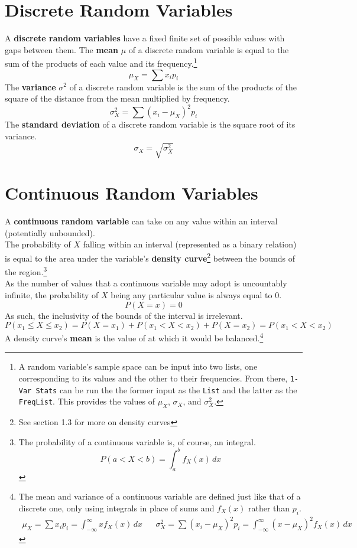 \documentclass[../AP_Statistics.tex]{subfiles}
\begin{document}
		\section{Discrete Random Variables}
			A \textbf{discrete random variables} have a fixed finite set of possible values with gaps between them.
			The \textbf{mean} $\mu$ of a discrete random variable is equal to the sum of the products of each value and its frequency.\footnote{A random variable's sample space can be input into two lists, one corresponding to its values and the other to their frequencies. From there, \texttt{1-Var Stats} can be run the the former input as the \texttt{List} and the latter as the \texttt{FreqList}. This provides the values of $\mu_X$, $\sigma_X$, and $\sigma_X^2$.}
			\[\mu_X = \sum x_ip_i\]
			The \textbf{variance} $\sigma^2$ of a discrete random variable is the sum of the products of the square of the distance from the mean multiplied by frequency.
			\[\sigma_X^2 = \sum(x_i - \mu_X)^2p_i\]
			The \textbf{standard deviation} of a discrete random variable is the square root of its variance.
			\[\sigma_X = \sqrt{\sigma_X^2}\]
		\section{Continuous Random Variables}
			A \textbf{continuous random variable} can take on any value within an interval (potentially unbounded). \\
			The probability of $X$ falling within an interval (represented as a binary relation) is equal to the area under the variable's \textbf{density curve}\footnote{See section 1.3 for more on density curves} between the bounds of the region.\footnote{The probability of a continuous variable is, of course, an integral.\[P(a < X < b) = \int_a^bf_X(x)\,dx\]} \\
			As the number of values that a continuous variable may adopt is uncountably infinite, the probability of $X$ being any particular value is always equal to 0.
			\[P(X = x) = 0\]
			As such, the inclusivity of the bounds of the interval is irrelevant.
			\[P(x_1 \le X \le x_2) = P(X = x_1) + P(x_1 < X < x_2) + P(X = x_2) = P(x_1 < X < x_2)\]
			A density curve's \textbf{mean} is the value of at which it would be balanced.\footnote{The mean and variance of a continuous variable are defined just like that of a discrete one, only using integrals in place of sums and $f_X(x)$ rather than $p_i$.\begin{align*}\mu_X = \sum x_ip_i = \int_{-\infty}^\infty xf_X(x)\,dx && \sigma_X^2 = \sum(x_i - \mu_X)^2p_i = \int_{-\infty}^\infty (x - \mu_X)^2f_X(x)\,dx \end{align*}} \\
\end{document}
